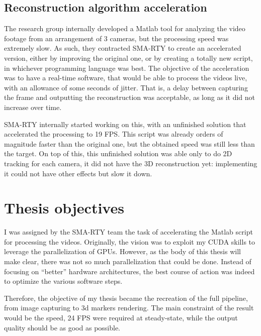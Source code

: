\subsection{Reconstruction algorithm acceleration}

The research group internally developed a Matlab tool for analyzing the video footage from an arrangement of 3 cameras, but the processing speed was extremely slow.
As such, they contracted SMA-RTY to create an accelerated version, either by improving the original one, or by creating a totally new script, in whichever programming language was best.
The objective of the acceleration was to have a real-time software, that would be able to process the videos live, with an allowance of some seconds of jitter.
That is, a delay between capturing the frame and outputting the reconstruction was acceptable, as long as it did not increase over time.

SMA-RTY internally started working on this, with an unfinished solution that accelerated the processing to 19 FPS.
This script was already orders of magnitude faster than the original one, but the obtained speed was still less than the target.
On top of this, this unfinished solution was able only to do 2D tracking for each camera, it did not have the 3D reconstruction yet: implementing  it could not have other effects but slow it down.

\section{Thesis objectives}

I was assigned by the SMA-RTY team the task of accelerating the Matlab script for processing the videos.
Originally, the vision was to exploit my CUDA skills to leverage the parallelization of GPUs.
However, as the body of this thesis will make clear, there was not so much parallelization that could be done.
Instead of focusing on ``better'' hardware architectures, the best course of action was indeed to optimize the various software steps.

Therefore, the objective of my thesis became the recreation of the full pipeline, from image capturing to 3d markers rendering.
The main constraint of the result would be the speed, 24 FPS were required at steady-state, while the output quality should be as good as possible.
